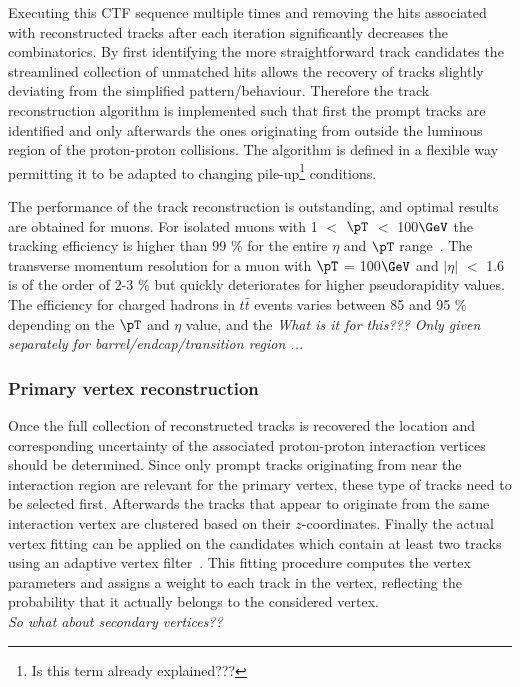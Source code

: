 Executing this CTF sequence multiple times and removing the hits associated with reconstructed tracks after each iteration significantly decreases the combinatorics. %
By first identifying the more straightforward track candidates the streamlined collection of unmatched hits allows the recovery of tracks slightly deviating from the simplified pattern/behaviour. 
Therefore the track reconstruction algorithm is implemented such that first the prompt tracks are identified and only afterwards the ones originating from outside the luminous region of the proton-proton collisions.
The algorithm is defined in a flexible way permitting it to be adapted to changing pile-up\footnote{Is this term already explained???} conditions.

The performance of the track reconstruction is outstanding, and optimal results are obtained for muons. For isolated muons with 1 $<$ $\pT$ $<$ 100$\GeV$ the tracking efficiency is higher than 99 $\%$ for the entire $\eta$ and $\pT$ range~\cite{TrackAndPVReco}. The transverse momentum resolution for a muon with $\pT$ = 100$\GeV$ and $\vert \eta \vert$ $<$ 1.6 is of the order of 2-3 $\%$ but quickly deteriorates for higher pseudorapidity values.
The efficiency for charged hadrons in $t\bar{t}$ events varies between 85 and 95 $\%$ depending on the $\pT$ and $\eta$ value, and the \textit{What is it for this??? Only given separately for barrel/endcap/transition region ...}

\subsubsection*{Primary vertex reconstruction}
Once the full collection of reconstructed tracks is recovered the location and corresponding uncertainty of the associated proton-proton interaction vertices should be determined. Since only prompt tracks originating from near the interaction region are relevant for the primary vertex, these type of tracks need to be selected first. Afterwards the tracks that appear to originate from the same interaction vertex are clustered based on their $z$-coordinates. Finally the actual vertex fitting can be applied on the candidates which contain at least two tracks using an adaptive vertex filter~\cite{AdaptiveVertexFitting}. This fitting procedure computes the vertex parameters and assigns a weight to each track in the vertex, reflecting the probability that it actually belongs to the considered vertex.\\
\textit{So what about secondary vertices??}

